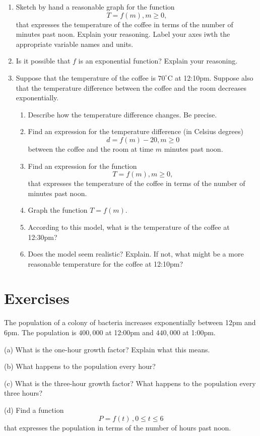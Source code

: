\documentclass{ximera}
\begin{document}
\begin{enumerate}
\item Sketch by hand a reasonable graph for the function
\[
 T = f(m) , m\geq 0 ,
\]
that expresses the temperature of the coffee in terms of the number of minutes past noon. Explain your reasoning. Label your axes iwth the appropriate variable names and units.

\item Is it possible that $f$ is an exponential function? Explain your reasoning.

\item Suppose that the temperature of the coffee is $70^\circ$C at 12:10pm. Suppose also that the temperature difference between the coffee and the room decreases exponentially.

\begin{enumerate}

\item Describe how the temperature difference changes. Be precise.

\item Find an expression for the temperature difference (in Celsius degrees)
\[
    d =  f(m) - 20 , m\geq 0
\]
between the coffee and the room at time $m$ minutes past noon.

\item Find an expression for  the function
\[
 T = f(m) , m\geq 0 ,
\]
that expresses the temperature of the coffee in terms of the number of minutes past noon.

\item Graph the function $T=f(m)$.

\item According to this model, what is the temperature of the coffee at 12:30pm?

\item Does the model seem realistic? Explain. If not, what might be a more reasonable temperature for the coffee at 12:10pm?

\end{enumerate}
\end{enumerate}



\section{Exercises}
\begin{question}   \label{Q4:ExponentialG}
The population of a colony of bacteria increases exponentially between 12pm and 6pm. The population is $400,000$ at 12:00pm and $440,000$ at 1:00pm. 

(a) What is the one-hour growth factor? Explain what this means.

(b) What happens to the population every hour?

(c) What is the three-hour growth factor? What happens to the population every three hours?

(d) Find a function 
\[
     P = f(t) \, , 0\leq t \leq 6 
\]
that expresses the population in terms of the number of hours past noon.

\end{question}
\end{document}

